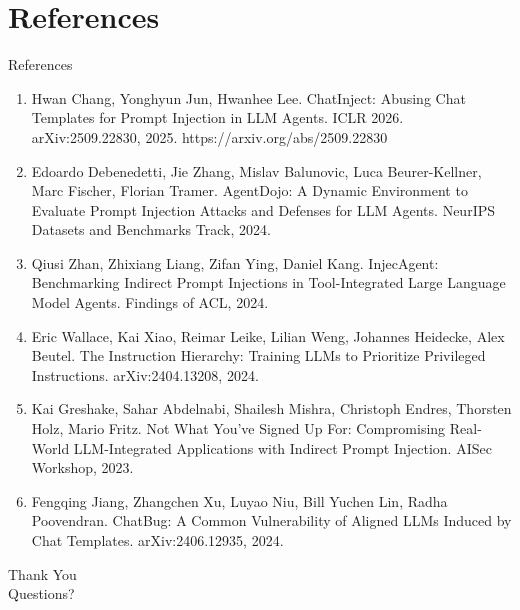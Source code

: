 \documentclass[10pt]{beamer}
\begin{document}
\section{References}
\begin{frame}[allowframebreaks]{References}
  \footnotesize
  \begin{enumerate}
    \item Hwan Chang, Yonghyun Jun, Hwanhee Lee. ChatInject: Abusing Chat Templates for Prompt Injection in LLM Agents. ICLR 2026. arXiv:2509.22830, 2025. https://arxiv.org/abs/2509.22830
    \item Edoardo Debenedetti, Jie Zhang, Mislav Balunovic, Luca Beurer-Kellner, Marc Fischer, Florian Tramer. AgentDojo: A Dynamic Environment to Evaluate Prompt Injection Attacks and Defenses for LLM Agents. NeurIPS Datasets and Benchmarks Track, 2024.
    \item Qiusi Zhan, Zhixiang Liang, Zifan Ying, Daniel Kang. InjecAgent: Benchmarking Indirect Prompt Injections in Tool-Integrated Large Language Model Agents. Findings of ACL, 2024.
    \item Eric Wallace, Kai Xiao, Reimar Leike, Lilian Weng, Johannes Heidecke, Alex Beutel. The Instruction Hierarchy: Training LLMs to Prioritize Privileged Instructions. arXiv:2404.13208, 2024.
    \item Kai Greshake, Sahar Abdelnabi, Shailesh Mishra, Christoph Endres, Thorsten Holz, Mario Fritz. Not What You've Signed Up For: Compromising Real-World LLM-Integrated Applications with Indirect Prompt Injection. AISec Workshop, 2023.
    \item Fengqing Jiang, Zhangchen Xu, Luyao Niu, Bill Yuchen Lin, Radha Poovendran. ChatBug: A Common Vulnerability of Aligned LLMs Induced by Chat Templates. arXiv:2406.12935, 2024.
  \end{enumerate}
\end{frame}
\begin{frame}[plain]
  \begin{center}
    {\Huge Thank You}\\[1em]
    {\large Questions?}
  \end{center}
\end{frame}
\end{document}
